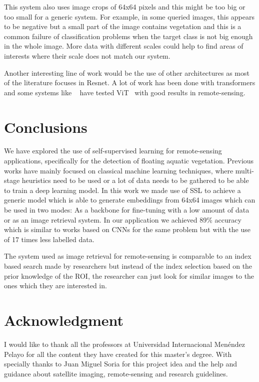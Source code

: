 \documentclass[conference]{IEEEtran}
\begin{document}
    This system also uses image crops of 64x64 pixels and this might be too big or too small for a generic system.
    For example, in some queried images, this appears to be negative but a small part of the image contains vegetation and this is a common failure of classification problems
    when the target class is not big enough in the whole image.
    More data with different scales could help to find areas of interests where their scale does not match our system.

    Another interesting line of work would be the use of other architectures as most of the literature focuses in Resnet.
    A lot of work has been done with transformers and some systems like ~\citet{wang2023ssl4eos12, li2022efficient} have tested ViT~\cite{dosovitskiy2021image} with good results in remote-sensing.


    \section{Conclusions}

    We have explored the use of self-supervised learning for remote-sensing applications, specifically for the detection of floating aquatic vegetation.
    Previous works have mainly focused on classical machine learning techniques, where multi-stage heuristics need to be used or a lot of data needs
    to be gathered to be able to train a deep learning model.
    In this work we made use of SSL to achieve a generic model which is able to generate embeddings from 64x64 images which can be used in two modes:
    As a backbone for fine-tuning with a low amount of data or as an image retrieval system.
    In our application we achieved 89\% accuracy which is similar to works based on CNNs for the same problem but with the use of 17 times less labelled data.

    The system used as image retrieval for remote-sensing is comparable to an index based search made by researchers but instead of the index selection based
    on the prior knowledge of the ROI, the researcher can just look for similar images to the ones which they are interested in.

    \section*{Acknowledgment}
    I would like to thank all the professors at Universidad Internacional Menéndez Pelayo for all the content they have created for this master's degree.
    With specially thanks to Juan Miguel Soria for this project idea and the help and guidance about satellite imaging, remote-sensing and research guidelines.
\end{document}

